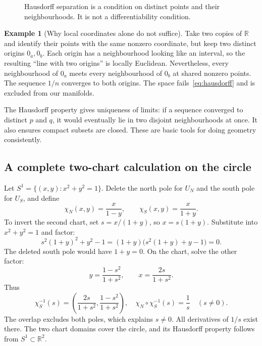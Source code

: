 \documentclass[11pt,a4paper]{article}
\numberwithin{equation}{section}
\theoremstyle{definition}
\newtheorem{example}[definition]{Example}
\theoremstyle{plain}
\theoremstyle{remark}
\newcommand{\R}{\mathbb R}
\begin{document}
\begin{figure}[htbp]\centering
{}
\caption{Hausdorff separation is a condition on distinct points and their neighbourhoods. It is not a differentiability condition.}
\end{figure}

\begin{example}[Why local coordinates alone do not suffice]
Take two copies of $\R$ and identify their points with the same nonzero coordinate, but keep two distinct origins $0_a,0_b$. Each origin has a neighbourhood looking like an interval, so the resulting ``line with two origins'' is locally Euclidean. Nevertheless, every neighbourhood of $0_a$ meets every neighbourhood of $0_b$ at shared nonzero points. The sequence $1/n$ converges to both origins. The space fails~\eqref{eq:hausdorff} and is excluded from our manifolds.
\end{example}
The Hausdorff property gives uniqueness of limits: if a sequence converged to distinct $p$ and $q$, it would eventually lie in two disjoint neighbourhoods at once. It also ensures compact subsets are closed. These are basic tools for doing geometry consistently.

\subsection{A complete two-chart calculation on the circle}
Let $S^1=\{(x,y):x^2+y^2=1\}$. Delete the north pole for $U_N$ and the south pole for $U_S$, and define
\[
\chi_N(x,y)=\frac{x}{1-y},\qquad \chi_S(x,y)=\frac{x}{1+y}.
\]
To invert the second chart, set $s=x/(1+y)$, so $x=s(1+y)$. Substitute into $x^2+y^2=1$ and factor:
\[
s^2(1+y)^2+y^2-1=(1+y)\bigl(s^2(1+y)+y-1\bigr)=0.
\]
The deleted south pole would have $1+y=0$. On the chart, solve the other factor:
\[
y=\frac{1-s^2}{1+s^2},\qquad x=\frac{2s}{1+s^2}.
\]
Thus
\[
\chi_S^{-1}(s)=\left(\frac{2s}{1+s^2},\frac{1-s^2}{1+s^2}\right),\quad
\chi_N\circ\chi_S^{-1}(s)=\frac1s\quad(s\ne0).
\]
The overlap excludes both poles, which explains $s\ne0$. All derivatives of $1/s$ exist there. The two chart domains cover the circle, and its Hausdorff property follows from $S^1\subset\R^2$.
\end{document}
